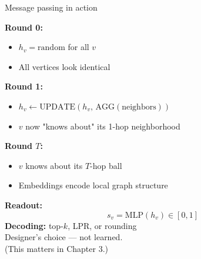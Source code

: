 \documentclass[aspectratio=169,10pt,dvipsnames]{beamer}
\begin{document}
\begin{frame}{Message passing in action}

\hfill
\begin{minipage}[t]{0.62\textwidth}
\small
\begin{overprint}
\textbf{Round 0:}
\begin{itemize}
  \item $h_v = \text{random}$ for all $v$
  \item All vertices look identical
\end{itemize}

\textbf{Round 1:}
\begin{itemize}
  \item $h_v \leftarrow \mathrm{UPDATE}(h_v,\, \mathrm{AGG}(\text{neighbors}))$
  \item $v$ now "knows about" its 1-hop neighborhood
\end{itemize}

\textbf{Round $T$:}
\begin{itemize}
  \item $v$ knows about its $T$-hop ball
  \item Embeddings encode local graph structure
\end{itemize}

\textbf{Readout:}
\[
  s_v = \mathrm{MLP}(h_v) \in [0,1]
\]
\textbf{Decoding:} top-$k$, LPR, or rounding\\
\alert{Designer's choice — not learned.}\\
(This matters in Chapter 3.)
\end{overprint}
\end{minipage}

\end{frame}
\end{document}
